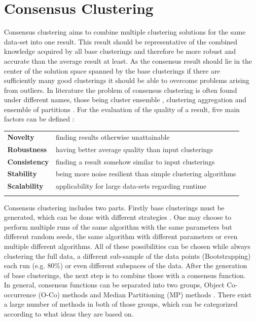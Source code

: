 \documentclass[
	a4paper,
	english,
	twoside,
	openright,               
	11pt                            
	]{report}
\begin{document}

\section{Consensus Clustering}\label{sec:consensus}
Consensus clustering aims to combine multiple clustering solutions for the same data-set into one result. This result should be representative of the combined knowledge acquired by all base clusterings and therefore be more robust and accurate than the average result at least. As the consensus result should lie in the center of the solution space spanned by the base clusterings if there are sufficiently many good clusterings it should be able to overcome problems arising from outliers. In literature the problem of consensus clustering is often found under different names, those being cluster ensemble \cite{BOONGOEN20181}, clustering aggregation \cite{Gionis2005ClusteringA} and ensemble of partitions \cite{ensemblepartitions}. For the evaluation of the quality of a result, five main factors can be defined \cite{Ghaemi2009ASC,survey1}:\newline

\begin{table}[ht]

\begin{tabular}{ll}
	\textbf{Novelty} & finding results otherwise unattainable \\
	\textbf{Robustness} & having better average quality than input clusterings \\
	\textbf{Consistency}   & finding a result somehow similar to input clusterings \\
	\textbf{Stability} & being more noise resilient than simple clustering algorithms \\
	\textbf{Scalability} & applicability for large data-sets regarding runtime \\
	&
\end{tabular}
\end{table}

Consensus clustering includes two parts. Firstly base clusterings must be generated, which can be done with different strategies \cite{BOONGOEN20181}. One may choose to perform multiple runs of the same algorithm with the same parameters but different random seeds, the same algorithm with different parameters or even multiple different algorithms. All of these possibilities can be chosen while always clustering the full data, a different sub-sample of the data points (Bootstrapping) \cite{bootstrapping} each run (e.g. 80\%) or even different subspaces of the data. After the generation of base clusterings, the next step is to combine those with a consensus function. In general, consensus functions can be separated into two groups, Object Co-occurrence (O-Co) methods and Median Partitioning (MP) methods \cite{survey1}. There exist a large number of methods in both of those groups, which can be categorized according to what ideas they are based on.
\end{document}
